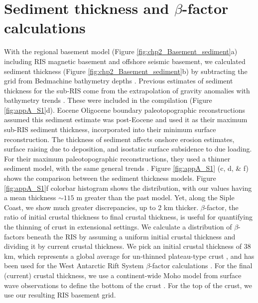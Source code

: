 \section{Sediment thickness and $\beta$-factor calculations} \label{appA:text_S6}
With the regional basement model (Figure \ref{fig:chp2_Basement_sediment}a) including RIS magnetic basement and offshore seismic basement, we calculated sediment thickness (Figure \ref{fig:chp2_Basement_sediment}b) by subtracting the grid from Bedmachine bathymetry depths \citep[Figure \ref{fig:chp2_Bathy_Mag}a \& \ref{fig:appA_S1}e,][]{morlighemdeep2020}. Previous estimates of sediment thickness for the sub-RIS come from the extrapolation of gravity anomalies with bathymetry trends \citep{wilsonwest2009}. These were included in the \citet{lindequepreglacial2016} compilation (Figure \ref{fig:appA_S1}d). Eocene Oligocene boundary paleotopographic reconstructions \citep{wilsonantarctic2012, paxmanreconstructions2019} assumed this sediment estimate was post-Eocene and used it as their maximum sub-RIS sediment thickness, incorporated into their minimum surface reconstruction. The thickness of sediment affects onshore erosion estimates, surface raising due to deposition, and isostatic surface subsidence to due loading. For their maximum paleotopographic reconstructions, they used a thinner sediment model, with the same general trends \citep{wilsonwest2009}. Figure \ref{fig:appA_S1} (c, d, \& f) shows the comparison between the sediment thickness models. Figure \ref{fig:appA_S1}f colorbar histogram shows the distribution, with our values having a mean thickness $\sim115$ m greater than the past model. Yet, along the Siple Coast, we show much greater discrepancies, up to 2 km thicker. $\beta$-factor, the ratio of initial crustal thickness to final crustal thickness, is useful for quantifying the thinning of crust in extensional settings. We calculate a distribution of $\beta$-factors beneath the RIS by assuming a uniform initial crustal thickness and dividing it by current crustal thickness. We pick an initial crustal thickness of 38 km, which represents a global average for un-thinned plateau-type crust \citep{mooneycrust1998}, and has been used for the West Antarctic Rift System $\beta$-factor calculations \citep{müllereocene2007}. For the final (current) crustal thickness, we use a continent-wide Moho model from surface wave observations to define the bottom of the crust \citep{ansvelocity2015}. For the top of the crust, we use our resulting RIS basement grid.

